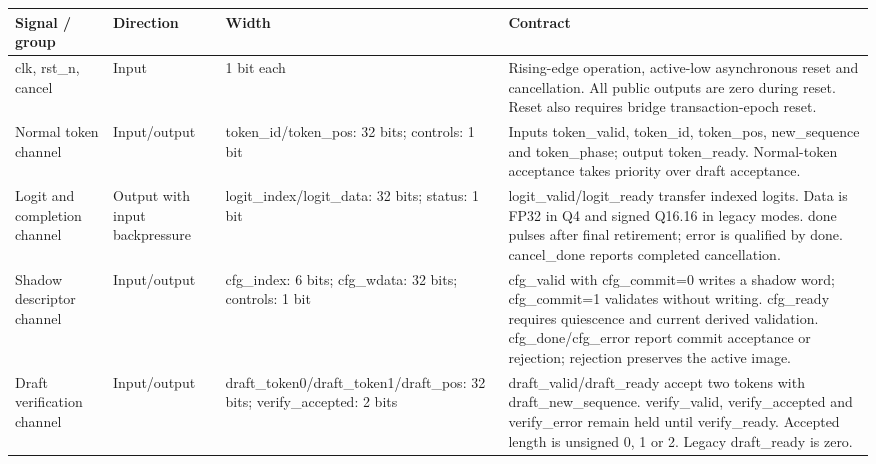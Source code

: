 \documentclass[11pt,a4paper]{article}
\begin{document}
{\small\renewcommand{\arraystretch}{1.18}\begin{longtable}{@{}L{0.21\textwidth}|L{0.12\textwidth}|L{0.12\textwidth}|L{0.45\textwidth}@{}}\toprule

\textbf{Signal /\allowbreak{} group} & \textbf{Direction} & \textbf{Width} & \textbf{Contract}\\\midrule\endhead

clk,\allowbreak{} rst\_\allowbreak{}n,\allowbreak{} cancel & Input & 1 bit each & Rising-edge operation,\allowbreak{} active-low asynchronous reset and cancellation. All public outputs are zero during reset. Reset also requires bridge transaction-epoch reset.\\[2pt]\hline

Normal token channel & Input/\allowbreak{}output & token\_\allowbreak{}id/\allowbreak{}token\_\allowbreak{}pos: 32 bits; controls: 1 bit & Inputs token\_\allowbreak{}valid,\allowbreak{} token\_\allowbreak{}id,\allowbreak{} token\_\allowbreak{}pos,\allowbreak{} new\_\allowbreak{}sequence and token\_\allowbreak{}phase; output token\_\allowbreak{}ready. Normal-token acceptance takes priority over draft acceptance.\\[2pt]\hline

Logit and completion channel & Output with input backpressure & logit\_\allowbreak{}index/\allowbreak{}logit\_\allowbreak{}data: 32 bits; status: 1 bit & logit\_\allowbreak{}valid/\allowbreak{}logit\_\allowbreak{}ready transfer indexed logits. Data is FP32 in Q4 and signed Q16.16 in legacy modes. done pulses after final retirement; error is qualified by done. cancel\_\allowbreak{}done reports completed cancellation.\\[2pt]\hline

Shadow descriptor channel & Input/\allowbreak{}output & cfg\_\allowbreak{}index: 6 bits; cfg\_\allowbreak{}wdata: 32 bits; controls: 1 bit & cfg\_\allowbreak{}valid with cfg\_\allowbreak{}commit=\allowbreak{}0 writes a shadow word; cfg\_\allowbreak{}commit=\allowbreak{}1 validates without writing. cfg\_\allowbreak{}ready requires quiescence and current derived validation. cfg\_\allowbreak{}done/\allowbreak{}cfg\_\allowbreak{}error report commit acceptance or rejection; rejection preserves the active image.\\[2pt]\hline

Draft verification channel & Input/\allowbreak{}output & draft\_\allowbreak{}token0/\allowbreak{}draft\_\allowbreak{}token1/\allowbreak{}draft\_\allowbreak{}pos: 32 bits; verify\_\allowbreak{}accepted: 2 bits & draft\_\allowbreak{}valid/\allowbreak{}draft\_\allowbreak{}ready accept two tokens with draft\_\allowbreak{}new\_\allowbreak{}sequence. verify\_\allowbreak{}valid,\allowbreak{} verify\_\allowbreak{}accepted and verify\_\allowbreak{}error remain held until verify\_\allowbreak{}ready. Accepted length is unsigned 0,\allowbreak{} 1 or 2. Legacy draft\_\allowbreak{}ready is zero.\\[2pt]\hline


\end{longtable}}
\end{document}
